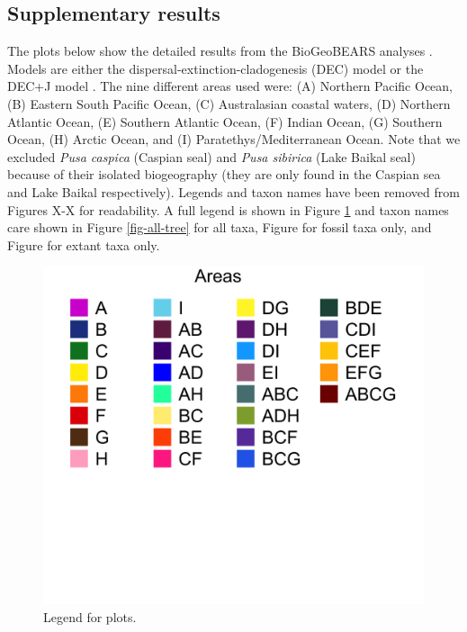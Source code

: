 \documentclass[a4paper, 12pt]{article}
\begin{document}
\subsection{Supplementary results}

The plots below show the detailed results from the BioGeoBEARS analyses \cite{matzke2013probabilistic}. Models are either the dispersal-extinction-cladogenesis (DEC) model \cite{ree2008maximum} or the DEC+J model \cite{matzke2014model}. 
The nine different areas used were: (A) Northern Pacific Ocean, (B) Eastern South Pacific Ocean, (C) Australasian coastal waters, (D) Northern Atlantic Ocean, (E) Southern Atlantic Ocean, (F) Indian Ocean, (G) Southern Ocean, (H) Arctic Ocean, and (I) Paratethys/Mediterranean Ocean. Note that we excluded \textit{Pusa caspica} (Caspian seal) and \textit{Pusa sibirica} (Lake Baikal seal) because of their isolated biogeography (they are only found in the Caspian sea and Lake Baikal respectively). 
Legends and taxon names have been removed from Figures X-X for readability. 
A full legend is shown in Figure \ref{fig-legend} and taxon names care shown in Figure \ref{fig-all-tree} for all taxa, Figure %
for fossil taxa only, and Figure %
for extant taxa only.

\begin{figure}[H]
 \centering
  \includegraphics[width = \linewidth]{figures/BGB-legend.png}
  \caption{Legend for plots.}
  \label{fig-legend}
\end{figure} 
\end{document}
